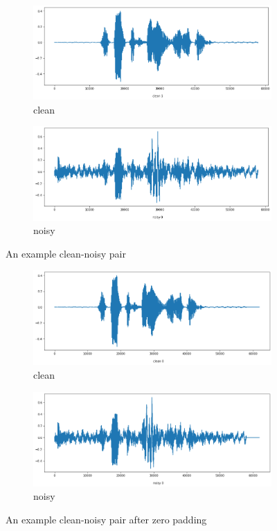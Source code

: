 \documentclass[12pt]{article}
\begin{document}
	
	\begin{figure}[H]
		\centering
		\begin{subfigure}{.5\textwidth}
			\centering
			\includegraphics[width=.8\linewidth]{wave_clean}
			\caption{clean}
			\label{fig:wave_clean}
		\end{subfigure}%
		\begin{subfigure}{.5\textwidth}
			\centering
			\includegraphics[width=.8\linewidth]{wave_noisy}
			\caption{noisy}
			\label{fig:wave_noisy}
		\end{subfigure}
		\caption{An example clean-noisy pair}
		\label{fig:clean_noisy}
		
		\begin{subfigure}{.5\textwidth}
			\centering
			\includegraphics[width=.8\linewidth]{wave_clean_padded}
			\caption{clean}
			\label{fig:wave_clean_padded}
		\end{subfigure}%
		\begin{subfigure}{.5\textwidth}
			\centering
			\includegraphics[width=.8\linewidth]{wave_noisy_padded}
			\caption{noisy}
			\label{fig:wave_noisy_padded}
		\end{subfigure}
		\caption{An example clean-noisy pair after zero padding}
		\label{fig:clean_noisy_padded}
	\end{figure}
\end{document}
